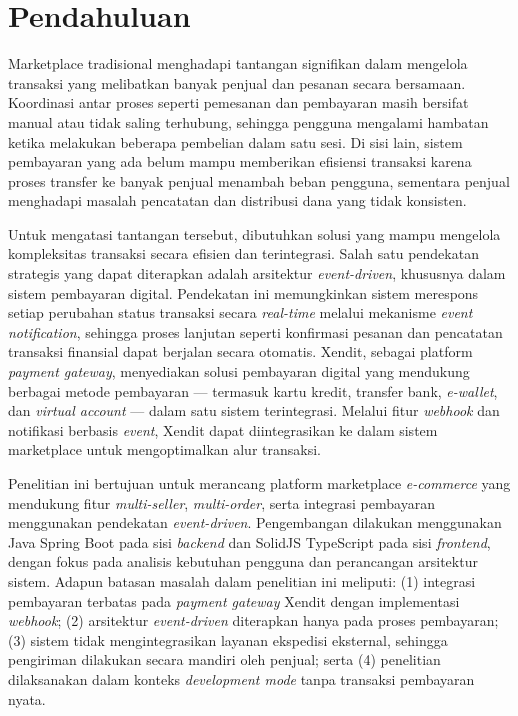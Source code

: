\documentclass[12pt,a4paper,twocolumn]{article}
\begin{document}
\section{Pendahuluan}

Marketplace tradisional menghadapi tantangan signifikan dalam mengelola transaksi yang melibatkan banyak penjual dan pesanan secara bersamaan. Koordinasi antar proses seperti pemesanan dan pembayaran masih bersifat manual atau tidak saling terhubung, sehingga pengguna mengalami hambatan ketika melakukan beberapa pembelian dalam satu sesi. Di sisi lain, sistem pembayaran yang ada belum mampu memberikan efisiensi transaksi karena proses transfer ke banyak penjual menambah beban pengguna, sementara penjual menghadapi masalah pencatatan dan distribusi dana yang tidak konsisten.

Untuk mengatasi tantangan tersebut, dibutuhkan solusi yang mampu mengelola kompleksitas transaksi secara efisien dan terintegrasi. Salah satu pendekatan strategis yang dapat diterapkan adalah arsitektur \textit{event-driven}, khususnya dalam sistem pembayaran digital. Pendekatan ini memungkinkan sistem merespons setiap perubahan status transaksi secara \textit{real-time} melalui mekanisme \textit{event notification}, sehingga proses lanjutan seperti konfirmasi pesanan dan pencatatan transaksi finansial dapat berjalan secara otomatis. Xendit, sebagai platform \textit{payment gateway}, menyediakan solusi pembayaran digital yang mendukung berbagai metode pembayaran --- termasuk kartu kredit, transfer bank, \textit{e-wallet}, dan \textit{virtual account} --- dalam satu sistem terintegrasi. Melalui fitur \textit{webhook} dan notifikasi berbasis \textit{event}, Xendit dapat diintegrasikan ke dalam sistem marketplace untuk mengoptimalkan alur transaksi.

Penelitian ini bertujuan untuk merancang platform marketplace \textit{e-commerce} yang mendukung fitur \textit{multi-seller}, \textit{multi-order}, serta integrasi pembayaran menggunakan pendekatan \textit{event-driven}. Pengembangan dilakukan menggunakan Java Spring Boot pada sisi \textit{backend} dan SolidJS TypeScript pada sisi \textit{frontend}, dengan fokus pada analisis kebutuhan pengguna dan perancangan arsitektur sistem. Adapun batasan masalah dalam penelitian ini meliputi: (1) integrasi pembayaran terbatas pada \textit{payment gateway} Xendit dengan implementasi \textit{webhook}; (2) arsitektur \textit{event-driven} diterapkan hanya pada proses pembayaran; (3) sistem tidak mengintegrasikan layanan ekspedisi eksternal, sehingga pengiriman dilakukan secara mandiri oleh penjual; serta (4) penelitian dilaksanakan dalam konteks \textit{development mode} tanpa transaksi pembayaran nyata.
\end{document}
